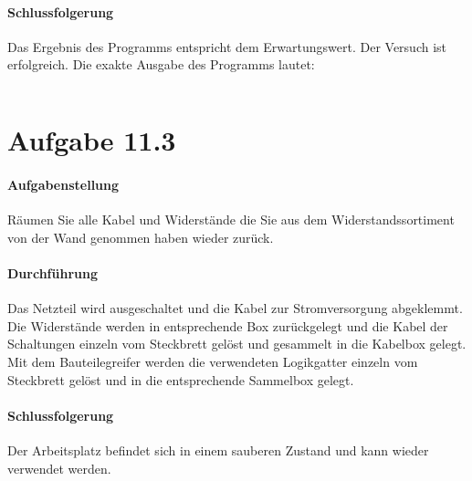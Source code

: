 \fontsize{12pt}{12pt}\inputminted[linenos=true, breaklines]{cpp}{../task11/main.cpp}

\paragraph{Schlussfolgerung}
Das Ergebnis des Programms entspricht dem Erwartungswert. Der Versuch ist erfolgreich. Die exakte Ausgabe des Programms lautet:

\fontsize{10pt}{10pt}\inputminted[breaklines]{console}{../task11/output.txt}

\section{Aufgabe 11.3}
\paragraph{Aufgabenstellung}
Räumen Sie alle Kabel und Widerstände die Sie aus dem Widerstandssortiment von der Wand genommen haben wieder zurück.

\paragraph{Durchführung}
Das Netzteil wird ausgeschaltet und die Kabel zur Stromversorgung abgeklemmt. Die Widerstände werden in entsprechende Box zurückgelegt und die Kabel der Schaltungen einzeln vom Steckbrett gelöst und gesammelt in die Kabelbox gelegt. Mit dem Bauteilegreifer werden die verwendeten Logikgatter einzeln vom Steckbrett gelöst und in die entsprechende Sammelbox gelegt.

\paragraph{Schlussfolgerung}
Der Arbeitsplatz befindet sich in einem sauberen Zustand und kann wieder verwendet werden.